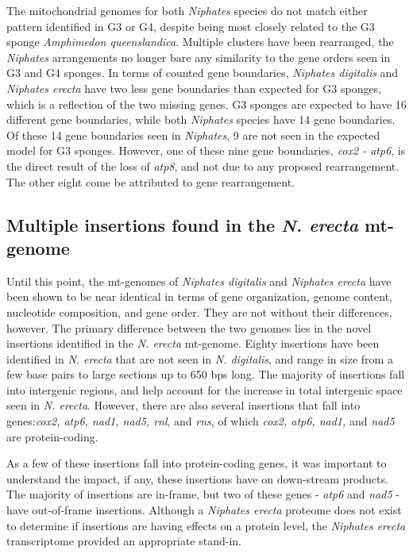 \documentclass[../main.tex]{subfiles}
\begin{document}
The mitochondrial genomes for both \emph{Niphates} species do not match either pattern identified in G3 or G4, despite being most closely related to the G3 sponge \emph{Amphimedon queenslandica}. Multiple clusters have been rearranged, the \emph{Niphates} arrangements no longer bare any similarity to the gene orders seen in G3 and G4 sponges. In terms of counted gene boundaries, \emph{Niphates digitalis} and \emph{Niphates erecta} have two less gene boundaries than expected for G3 sponges, which is a reflection of the two missing genes. G3 sponges are expected to have 16 different gene boundaries, while both \emph{Niphates} species have 14 gene boundaries. Of these 14 gene boundaries seen in \emph{Niphates}, 9 are not seen in the expected model for G3 sponges. However, one of these nine gene boundaries, \emph{cox2 - atp6}, is the direct result of the loss of \emph{atp8}, and not due to any proposed rearrangement. The other eight come be attributed to gene rearrangement.

\subsection{Multiple insertions found in the \emph{N. erecta} mt-genome}

Until this point, the mt-genomes of \emph{Niphates digitalis} and \emph{Niphates erecta} have been shown to be near identical in terms of gene organization, genome content, nucleotide composition, and gene order. They are not without their differences, however. The primary difference between the two genomes lies in the novel insertions identified in the \emph{N. erecta} mt-genome. Eighty insertions have been identified in \emph{N. erecta} that are not seen in \emph{N. digitalis}, and range in size from a few base pairs to large sections up to 650 bps long. The majority of insertions fall into intergenic regions, and help account for the increase in total intergenic space seen in \emph{N. erecta}. However, there are also several insertions that fall into genes:\emph{cox2, atp6, nad1, nad5, rnl}, and \emph{rns}, of which \emph{cox2, atp6, nad1,} and \emph{nad5} are protein-coding.

As a few of these insertions fall into protein-coding genes, it was important to understand the impact, if any, these insertions have on down-stream products. The majority of insertions are in-frame, but two of these genes - \emph{atp6} and \emph{nad5} - have out-of-frame insertions. Although a \emph{Niphates erecta} proteome does not exist to determine if insertions are having effects on a protein level, the \emph{Niphates erecta} transcriptome provided an appropriate stand-in.
\end{document}
